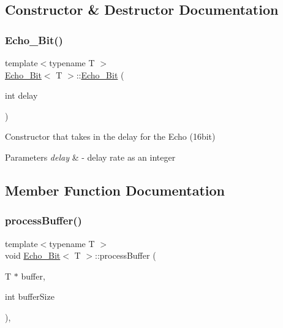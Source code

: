 \subsection{Constructor \& Destructor Documentation}
\mbox{\label{classEcho__16Bit_a2de1f2cafb7b8412ce98597351f8bf2c}} 
\subsubsection{\texorpdfstring{Echo\+\_\+Bit()}{Echo\_16Bit()}}
{\footnotesize\ttfamily template$<$typename T $>$ \\
\hyperlink{classEcho__16Bit}{Echo\+\_\+Bit}$<$ T $>$\+::\hyperlink{classEcho__16Bit}{Echo\+\_\+Bit} (\begin{DoxyParamCaption}\item[{int}]{delay }\end{DoxyParamCaption})\hspace{0.3cm}{\ttfamily [explicit]}}

Constructor that takes in the delay for the Echo (16bit) 
\begin{DoxyParams}{Parameters}
{\em delay} & -\/ delay rate as an integer \\
\hline
\end{DoxyParams}


\subsection{Member Function Documentation}
\mbox{\label{classEcho__16Bit_ac3ba5af13a6bc7c62c6efa932ebd6f48}} 
\subsubsection{\texorpdfstring{process\+Buffer()}{processBuffer()}}
{\footnotesize\ttfamily template$<$typename T $>$ \\
void \hyperlink{classEcho__16Bit}{Echo\+\_\+Bit}$<$ T $>$\+::process\+Buffer (\begin{DoxyParamCaption}\item[{T $\ast$}]{buffer,  }\item[{int}]{buffer\+Size }\end{DoxyParamCaption})\hspace{0.3cm}{\ttfamily [override]}, {\ttfamily [virtual]}}


